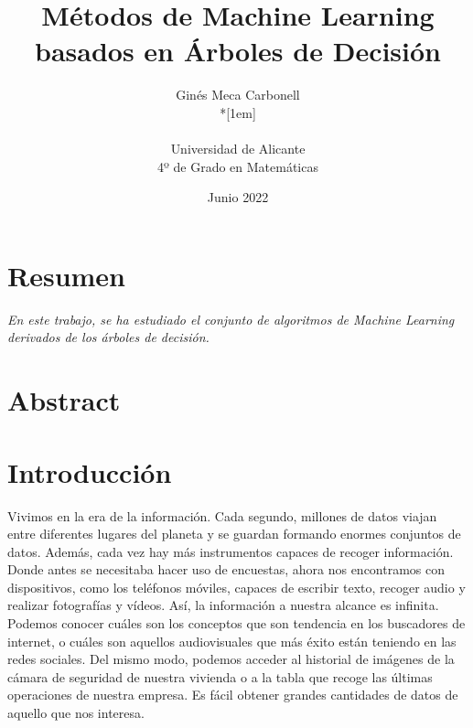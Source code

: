 \documentclass[12pt,twoside]{article}
\title{Métodos de Machine Learning basados en Árboles de Decisión}
\author{Ginés Meca Carbonell\\*[1em]
\begin{minipage}{0.75\textwidth}
\footnotesize \itshape
\begin{center}
Universidad de Alicante \\
4º de Grado en Matemáticas
\end{center}
\end{minipage}
}
\date{Junio 2022}
\begin{document}




\section*{Resumen}

\emph{En este trabajo, se ha estudiado el conjunto de algoritmos de Machine Learning derivados de los árboles de decisión.}

\newpage



\section*{Abstract}

\emph{}

\newpage



\tableofcontents



\newpage



\section{Introducción}

Vivimos en la era de la información. Cada segundo, millones de datos viajan entre diferentes lugares del planeta y se guardan formando enormes conjuntos de datos. Además, cada vez hay más instrumentos capaces de recoger información. Donde antes se necesitaba hacer uso de encuestas, ahora nos encontramos con dispositivos, como los teléfonos móviles, capaces de escribir texto, recoger audio y realizar fotografías y vídeos. Así, la información a nuestra alcance es infinita. Podemos conocer cuáles son los conceptos que son tendencia en los buscadores de internet, o cuáles son aquellos audiovisuales que más éxito están teniendo en las redes sociales. Del mismo modo, podemos acceder al historial de imágenes de la cámara de seguridad de nuestra vivienda o a la tabla que recoge las últimas operaciones de nuestra empresa. Es fácil obtener grandes cantidades de datos de aquello que nos interesa.
\end{document}
